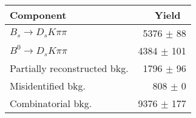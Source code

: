  \begin{tabular}{l r }
\hline\hline
Component & Yield\ \\
\hline
$B_s \to D_s K \pi \pi$ & 5376 $\pm$ 88 \\
$B^{0} \to D_s K \pi \pi$ & 4384 $\pm$ 101 \\
Partially reconstructed bkg. & 1796 $\pm$ 96 \\
Misidentified bkg. & 808 $\pm$ 0 \\
Combinatorial bkg. & 9376 $\pm$ 177 \\
\hline\hline
\end{tabular}
\label{table:signalYields}
